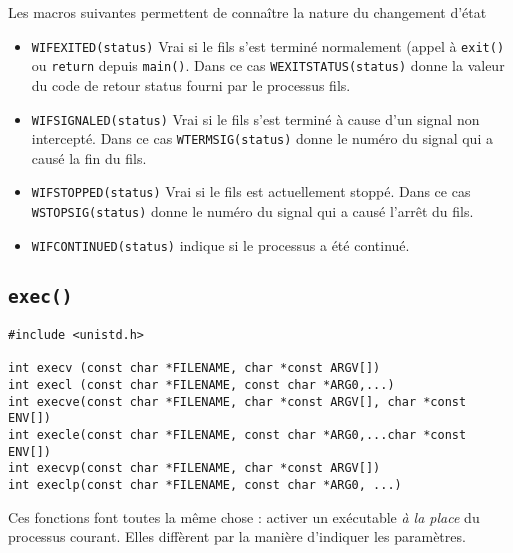 Les macros suivantes permettent de connaître la nature du changement d'état


\begin{itemize}
\item 
  \texttt{WIFEXITED(status)} Vrai si le fils s'est terminé normalement
  (appel à \texttt{exit()} ou \texttt{return} depuis \texttt{main()}.
  Dans ce cas \texttt{WEXITSTATUS(status)} donne la
  valeur du code de retour status fourni par le processus fils.
\item
  \texttt{WIFSIGNALED(status)}
  Vrai si le fils s'est terminé à cause d'un signal non intercepté.
  Dans ce cas \texttt{WTERMSIG(status)}
              donne le numéro du signal qui a causé la fin du fils. 
\item \texttt{WIFSTOPPED(status)}
  Vrai si le fils est actuellement stoppé.
  Dans ce cas \texttt{WSTOPSIG(status)}
  donne le numéro du signal qui a causé l'arrêt du fils. 
\item \texttt{WIFCONTINUED(status)}
  indique si le processus a été continué.
\end{itemize}


\source



\subsection{\texttt{exec()}}


\extrait
\begin{lstlisting}
#include <unistd.h>

int execv (const char *FILENAME, char *const ARGV[])
int execl (const char *FILENAME, const char *ARG0,...)
int execve(const char *FILENAME, char *const ARGV[], char *const ENV[])
int execle(const char *FILENAME, const char *ARG0,...char *const ENV[])
int execvp(const char *FILENAME, char *const ARGV[])
int execlp(const char *FILENAME, const char *ARG0, ...)
\end{lstlisting}

  
Ces fonctions font toutes la même chose : activer un exécutable
\emph{à la place} du processus courant. Elles diffèrent par
la manière d'indiquer les paramètres.

